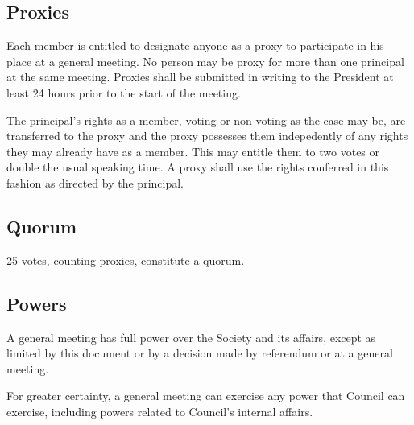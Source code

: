 \subsection{Proxies}
Each member is entitled to designate anyone as a proxy to participate in his
place at a general meeting. No person may be proxy for more than one principal
at the same meeting. Proxies shall be submitted in writing to the President at
least 24 hours prior to the start of the meeting.

The principal's rights as a member, voting or non-voting as the case may be, are
transferred to the proxy and the proxy possesses them indepedently of any rights
they may already have as a member. This may entitle them to two votes or double
the usual speaking time. A proxy shall use the rights conferred in this fashion
as directed by the principal.

\subsection{Quorum}
25 votes, counting proxies, constitute a quorum.

\subsection{Powers}
A general meeting has full power over the Society and its affairs, except as
limited by this document or by a decision made by referendum or at a general
meeting.

For greater certainty, a general meeting can exercise any power that Council can
exercise, including powers related to Council's internal affairs.
